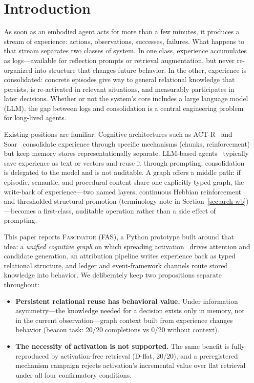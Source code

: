 \documentclass[10pt,a4paper]{article}
\begin{document}
\section{Introduction}
\label{sec:intro}

As soon as an embodied agent acts for more than a few minutes, it produces a stream of experience: actions, observations, successes, failures. What happens to that stream separates two classes of system. In one class, experience accumulates as logs---available for reflection prompts or retrieval augmentation, but never re-organized into structure that changes future behavior. In the other, experience is consolidated: concrete episodes give way to general relational knowledge that persists, is re-activated in relevant situations, and measurably participates in later decisions. Whether or not the system's core includes a large language model (LLM), the gap between logs and consolidation is a central engineering problem for long-lived agents.

Existing positions are familiar. Cognitive architectures such as ACT-R~\citep{anderson2004integrated} and Soar~\citep{laird2012soar} consolidate experience through specific mechanisms (chunks, reinforcement) but keep memory stores representationally separate. LLM-based agents~\citep{yao2023react,park2023generative,shinn2023reflexion} typically save experience as text or vectors and reuse it through prompting; consolidation is delegated to the model and is not auditable. A graph offers a middle path: if episodic, semantic, and procedural content share one explicitly typed graph, the write-back of experience---two named layers, continuous Hebbian reinforcement and thresholded structural promotion (terminology note in Section~\ref{sec:arch-wb})---becomes a first-class, auditable operation rather than a side effect of prompting.

This paper reports \textsc{Fascinator} (FAS), a Python prototype built around that idea: a \emph{unified cognitive graph} on which spreading activation~\citep{collins1975spreading} drives attention and candidate generation, an attribution pipeline writes experience back as typed relational structure, and ledger and event-framework channels route stored knowledge into behavior. We deliberately keep two propositions separate throughout:

\begin{itemize}
\item[(a)] \textbf{Persistent relational reuse has behavioral value.} Under information asymmetry---the knowledge needed for a decision exists only in memory, not in the current observation---graph context built from experience changes behavior (beacon task: 20/20 completions vs 0/20 without context).
\item[(b)] \textbf{The necessity of activation is not supported.} The same benefit is fully reproduced by activation-free retrieval (D-flat, 20/20), and a preregistered mechanism campaign rejects activation's incremental value over flat retrieval under all four confirmatory conditions.
\end{itemize}
\end{document}
